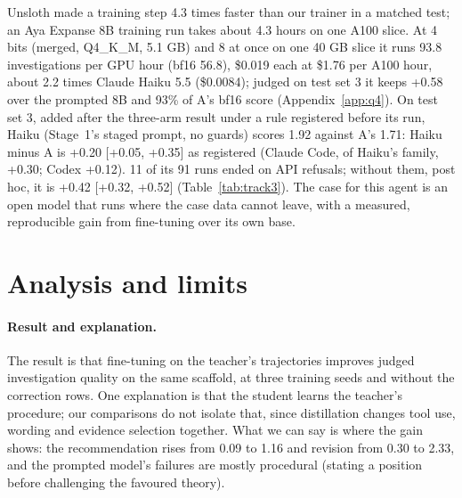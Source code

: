 \documentclass[11pt]{article}
\begin{document}
Unsloth made a training step 4.3 times faster than our trainer in a matched test; an Aya Expanse 8B training run takes about 4.3 hours on one A100 slice. At 4 bits (merged, Q4\_K\_M, 5.1 GB) and 8 at once on one 40 GB
slice it runs 93.8 investigations per GPU hour (bf16 56.8), \$0.019 each at \$1.76 per A100 hour, about 2.2 times
Claude Haiku 5.5 (\$0.0084); judged on test set 3 it keeps +0.58 over the prompted 8B and 93\% of A's bf16 score
(Appendix~\ref{app:q4}). On test set 3, added after the three-arm result
under a rule registered before its run, Haiku (Stage~1's staged prompt, no guards) scores 1.92 against A's 1.71:
Haiku minus A is +0.20 [+0.05, +0.35] as registered (Claude Code, of Haiku's family, +0.30; Codex +0.12). 11 of its 91
runs ended on API refusals; without them, post hoc, it is +0.42 [+0.32, +0.52] (Table~\ref{tab:track3}). The case for this agent is an open model that runs where
the case data cannot leave, with a measured, reproducible gain from fine-tuning over its own base.

\section{Analysis and limits}
\label{sec:analysis}

\paragraph{Result and explanation.} The result is that fine-tuning on the teacher's trajectories improves judged
investigation quality on the same scaffold, at three
training seeds and without the correction rows. One explanation is that the
student learns the teacher's procedure; our comparisons do not isolate that, since distillation changes tool use,
wording and evidence selection together. What we can say is where the gain shows: the recommendation rises from 0.09
to 1.16 and revision from 0.30 to 2.33, and the prompted model's failures are mostly procedural (stating a position
before challenging the favoured theory).
\end{document}
